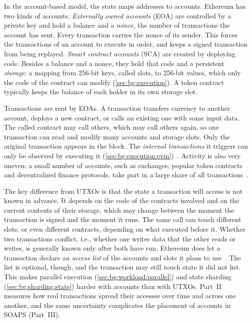 In the account-based model, the state maps addresses to accounts.
Ethereum has two kinds of accounts.
\emph{Externally owned accounts} (EOA) are controlled by a private key and hold a balance and a \emph{nonce}, the number of transactions the account has sent.
Every transaction carries the nonce of its sender.
This forces the transactions of an account to execute in order, and keeps a signed transaction from being replayed.
\emph{Smart contract accounts} (SCA) are created by deploying code.
Besides a balance and a nonce, they hold that code and a persistent \emph{storage}: a mapping from 256-bit keys, called slots, to 256-bit values, which only the code of the contract can modify (\autoref{sec:bg:execution}).
A token contract typically keeps the balance of each holder in its own storage slot.

Transactions are sent by EOAs.
A transaction transfers currency to another account, deploys a new contract, or calls an existing one with some input data.
The called contract may call others, which may call others again, so one transaction can read and modify many accounts and storage slots.
Only the original transaction appears in the block.
The \emph{internal transactions} it triggers can only be observed by executing it (\autoref{sec:bg:execution:evm})~\cite{pigaglio2023exploring}.
Activity is also very uneven: a small number of accounts, such as exchanges, popular token contracts and decentralized finance protocols, take part in a large share of all transactions~\cite{guo2019graph}.

The key difference from UTXOs is that the state a transaction will access is not known in advance.
It depends on the code of the contracts involved and on the current contents of their storage, which may change between the moment the transaction is signed and the moment it runs.
The same call can touch different slots, or even different contracts, depending on what executed before it.
Whether two transactions conflict, i.e., whether one writes data that the other reads or writes, is generally known only after both have run.
Ethereum does let a transaction declare an \emph{access list} of the accounts and slots it plans to use~\cite{eip2930}.
The list is optional, though, and the transaction may still touch state it did not list.
This makes parallel execution (\autoref{sec:bg:workload:parallel}) and state sharding (\autoref{sec:bg:sharding:state}) harder with accounts than with UTXOs.
Part~II measures how real transactions spread their accesses over time and across one another, and the same uncertainty complicates the placement of accounts in SOAPS (Part~III).

